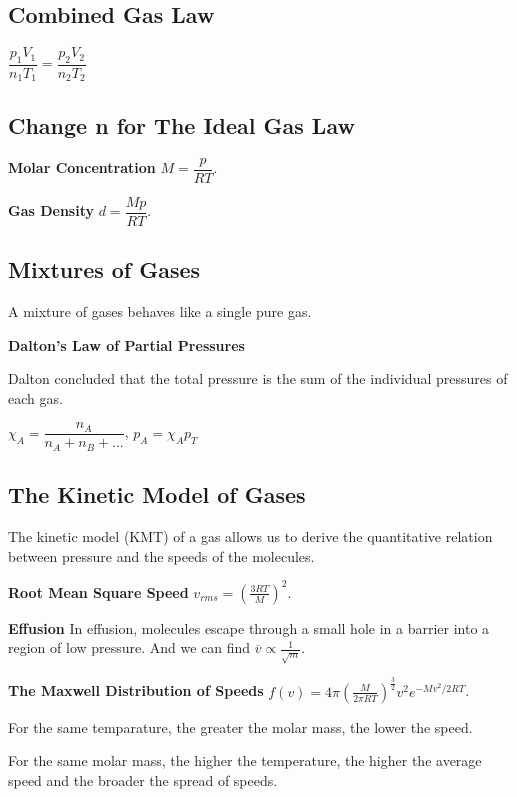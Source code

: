\documentclass[a4paper,12pt]{article}
\begin{document}
\subsection{Combined Gas Law}
\begin{center}
$\dfrac{p_{1}V_{1}}{n_{1}T_{1}}=\dfrac{p_{2}V_{2}}{n_{2}T_{2}}$
\end{center}
\subsection{Change n for The Ideal Gas Law}
\textbf{Molar Concentration} $M=\dfrac{p}{RT}$.\par
\textbf{Gas Density} $d=\dfrac{Mp}{RT}$.
\subsection{Mixtures of Gases}
A mixture of gases behaves like a single pure gas.\par
\textbf{Dalton's Law of Partial Pressures}\par
Dalton concluded that the total pressure is the sum of the individual pressures of each gas.
\begin{center}
$\chi_{A}=\dfrac{n_{A}}{n_{A}+n_{B}+...}$, $p_{A}=\chi_{A}p_{T}$
\end{center}
\subsection{The Kinetic Model of Gases}
The kinetic model (KMT) of a gas allows us to derive the quantitative relation between pressure and the speeds of the molecules.\par
\textbf{Root Mean Square Speed} $v_{rms}=(\frac{3RT}{M})^{2}$.\par
\textbf{Effusion} In effusion, molecules escape through a small hole in a barrier into a region of low pressure. And we can find $\overline{v}\propto \frac{1}{\sqrt{m}}$.\par
\textbf{The Maxwell Distribution of Speeds} $f(v)=4\pi (\frac{M}{2\pi RT})^{\frac{3}{2}}v^{2}e^{-Mv^{2}/2RT}$.\par
For the same temparature, the greater the molar mass, the lower the speed.\par
For the same molar mass, the higher the temperature, the higher the average speed and the broader the spread of speeds.
\end{document}

